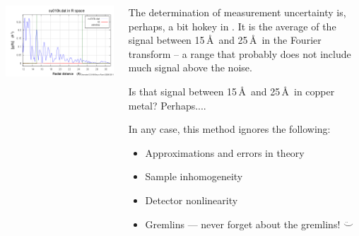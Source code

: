 \documentclass[10pt, xcolor=x11names, compress]{beamer}
\begin{document}
\begin{frame}
\begin{columns}
\begin{column}{0.3\linewidth}
      \includegraphics[width=\linewidth]{info/cu_chir12_31.png}      
    \end{column}
    \begin{column}{0.7\linewidth}
      The determination of measurement uncertainty is, perhaps, a bit
      hokey in {\ifeffit}.  It is the average of the signal between
      15\,\AA\ and 25\,\AA\ in the Fourier transform -- a range that
      probably does not include much signal above the noise.

      \bigskip

      Is that signal between 15\,\AA\ and 25\,\AA\ in copper metal?
      Perhaps....

      \bigskip

      In any case, this method ignores the following:
      \begin{itemize}
      \item Approximations and errors in theory
      \item Sample inhomogeneity
      \item Detector nonlinearity
      \item Gremlins --- never forget about the gremlins! $\ddot\smile$
      \end{itemize}
    \end{column}
  \end{columns}
\end{frame}
\end{document}
